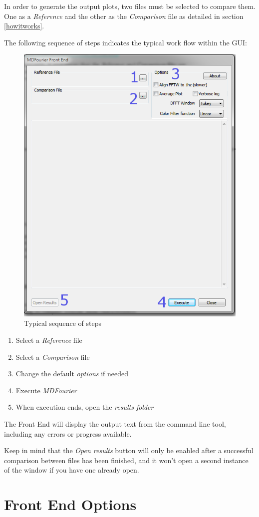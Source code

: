 \documentclass[10pt,a4paper]{report}
\begin{document}
In order to generate the output plots, two files must be selected to compare them. One as a \textit{Reference} and the other as the \textit{Comparison} file as detailed in section \ref{howitworks}.

The following sequence of steps indicates the typical work flow within the GUI:

\begin{figure}[H]
	\centering
	\includegraphics[width=0.6\linewidth]{plots/GUI2.png}
	\caption[Steps]{Typical sequence of steps}
	\label{fig:gui2}
\end{figure}

\begin{enumerate}
	\item Select a \textit{Reference} file
	\item Select a \textit{Comparison} file
	\item Change the default \textit{options} if needed
	\item Execute \textit{MDFourier}
	\item When execution ends, open the \textit{results folder}
\end{enumerate}

The Front End will display the output text from the command line tool, including any errors or progress available.

Keep in mind that the \textit{Open results} button will only be enabled after a successful comparison between files has been finished, and it won't open a second instance of the window if you have one already open.

\section{Front End Options}
\end{document}
